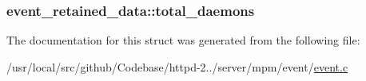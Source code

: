 \subsubsection[{\texorpdfstring{total\+\_\+daemons}{total_daemons}}]{ event\+\_\+retained\+\_\+data\+::total\+\_\+daemons}\hypertarget{structevent__retained__data_a33a48ee4d4414e2b6e3be332bd0f64c4}{}\label{structevent__retained__data_a33a48ee4d4414e2b6e3be332bd0f64c4}


The documentation for this struct was generated from the following file\+:\begin{DoxyCompactItemize}
\item 
/usr/local/src/github/\+Codebase/httpd-\/2../server/mpm/event/\hyperlink{event_8c}{event.\+c}\end{DoxyCompactItemize}
